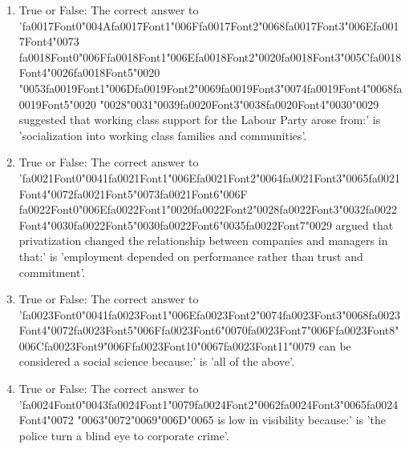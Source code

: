 \documentclass[12pt]{article}
\begin{document}
\begin{enumerate}[label=\arabic*.]
\item True or False: The correct answer to '{\csname fa0017Font0\endcsname\char"004A}{\csname fa0017Font1\endcsname\char"006F}{\csname fa0017Font2\endcsname\char"0068}{\csname fa0017Font3\endcsname\char"006E}{\csname fa0017Font4\endcsname\char"0073} {\csname fa0018Font0\endcsname\char"006F}{\csname fa0018Font1\endcsname\char"006E}{\csname fa0018Font2\endcsname\char"0020}{\csname fa0018Font3\endcsname\char"005C}{\csname fa0018Font4\endcsname\char"0026}{\csname fa0018Font5\endcsname\char"0020} {\char"0053}{\csname fa0019Font1\endcsname\char"006D}{\csname fa0019Font2\endcsname\char"0069}{\csname fa0019Font3\endcsname\char"0074}{\csname fa0019Font4\endcsname\char"0068}{\csname fa0019Font5\endcsname\char"0020} {\char"0028}{\char"0031}{\char"0039}{\csname fa0020Font3\endcsname\char"0038}{\csname fa0020Font4\endcsname\char"0030}{\char"0029} suggested that working class support for the Labour Party arose from:' is 'socialization into working class families and communities'.
\item True or False: The correct answer to '{\csname fa0021Font0\endcsname\char"0041}{\csname fa0021Font1\endcsname\char"006E}{\csname fa0021Font2\endcsname\char"0064}{\csname fa0021Font3\endcsname\char"0065}{\csname fa0021Font4\endcsname\char"0072}{\csname fa0021Font5\endcsname\char"0073}{\csname fa0021Font6\endcsname\char"006F} {\csname fa0022Font0\endcsname\char"006E}{\csname fa0022Font1\endcsname\char"0020}{\csname fa0022Font2\endcsname\char"0028}{\csname fa0022Font3\endcsname\char"0032}{\csname fa0022Font4\endcsname\char"0030}{\csname fa0022Font5\endcsname\char"0030}{\csname fa0022Font6\endcsname\char"0035}{\csname fa0022Font7\endcsname\char"0029} argued that privatization changed the relationship between companies and managers in that:' is 'employment depended on performance rather than trust and commitment'.
\item True or False: The correct answer to '{\csname fa0023Font0\endcsname\char"0041}{\csname fa0023Font1\endcsname\char"006E}{\csname fa0023Font2\endcsname\char"0074}{\csname fa0023Font3\endcsname\char"0068}{\csname fa0023Font4\endcsname\char"0072}{\csname fa0023Font5\endcsname\char"006F}{\csname fa0023Font6\endcsname\char"0070}{\csname fa0023Font7\endcsname\char"006F}{\csname fa0023Font8\endcsname\char"006C}{\csname fa0023Font9\endcsname\char"006F}{\csname fa0023Font10\endcsname\char"0067}{\csname fa0023Font11\endcsname\char"0079} can be considered a social science because:' is 'all of the above'.
\item True or False: The correct answer to '{\csname fa0024Font0\endcsname\char"0043}{\csname fa0024Font1\endcsname\char"0079}{\csname fa0024Font2\endcsname\char"0062}{\csname fa0024Font3\endcsname\char"0065}{\csname fa0024Font4\endcsname\char"0072} {\char"0063}{\char"0072}{\char"0069}{\char"006D}{\char"0065} is low in visibility because:' is 'the police turn a blind eye to corporate crime'.
\end{enumerate}
\end{document}
